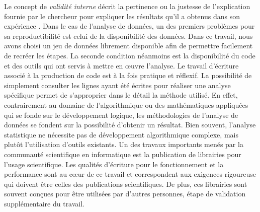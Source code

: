 Le concept de \textit{validité interne} décrit la pertinence ou la justesse de l'explication fournie par le chercheur pour expliquer les résultats qu'il a obtenus dans son expérience \cite{Yin2009a}. Dans le cas de l'analyse de données, un des premiers problèmes pour sa reproductibilité est celui de la disponibilité des données. Dans ce travail, nous avons choisi un jeu de données librement disponible afin de permettre facilement de recréer les étapes. La seconde condition néanmoins est la disponibilité du code et des outils qui ont servis à mettre en œuvre l'analyse. Le travail d'écriture associé à la production de code est à la fois pratique et réflexif. La possibilité de simplement consulter les lignes ayant été écrites pour réaliser une analyse spécifique permet de s'approprier dans le détail la méthode utilisé. En effet, contrairement au domaine de l'algorithmique ou des mathématiques appliquées qui se fonde sur le développement logique, les méthodologies de l'analyse de données se fondent sur la possibilité d'obtenir un résultat. Bien souvent, l'analyse statistique ne nécessite pas de développement algorithmique complexe, mais plutôt l'utilisation d'outils existants. Un des travaux importants menés par la communauté scientifique en informatique est la publication de librairies pour l'usage scientifique. Les qualités d'écriture pour le fonctionnement et la performance sont au cœur de ce travail et correspondent aux exigences rigoureuse qui doivent être celles des publications scientifiques. De plus, ces librairies sont souvent conçues pour être utilisées par d'autres personnes, étape de validation supplémentaire du travail. 

